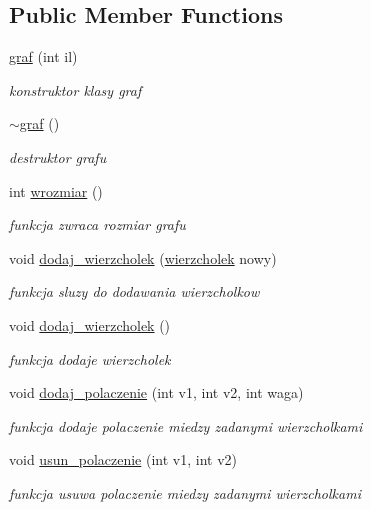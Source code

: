 \subsection*{\-Public \-Member \-Functions}
\begin{DoxyCompactItemize}
\item 
\hyperlink{classgraf_a66fe29b772c7e3085b161a31682ef093}{graf} (int il)
\begin{DoxyCompactList}\small\item\em konstruktor klasy graf \end{DoxyCompactList}\item 
\hyperlink{classgraf_a9aefd40799975c316a17bd67021e05f2}{$\sim$graf} ()
\begin{DoxyCompactList}\small\item\em destruktor grafu \end{DoxyCompactList}\item 
int \hyperlink{classgraf_aa045d28e07e38ca32adf1b353077f877}{wrozmiar} ()
\begin{DoxyCompactList}\small\item\em funkcja zwraca rozmiar grafu \end{DoxyCompactList}\item 
void \hyperlink{classgraf_a6a50b0bfb5fc3cfc7a443014170b9565}{dodaj\-\_\-wierzcholek} (\hyperlink{classwierzcholek}{wierzcholek} nowy)
\begin{DoxyCompactList}\small\item\em funkcja sluzy do dodawania wierzcholkow \end{DoxyCompactList}\item 
void \hyperlink{classgraf_afaa55f5a9aef1f30a2b3be97b59a476b}{dodaj\-\_\-wierzcholek} ()
\begin{DoxyCompactList}\small\item\em funkcja dodaje wierzcholek \end{DoxyCompactList}\item 
void \hyperlink{classgraf_a4db0ebc4302facfc027dd7790542fb94}{dodaj\-\_\-polaczenie} (int v1, int v2, int waga)
\begin{DoxyCompactList}\small\item\em funkcja dodaje polaczenie miedzy zadanymi wierzcholkami \end{DoxyCompactList}\item 
void \hyperlink{classgraf_ac7e01e940f136f4020e4da816c2fb1b4}{usun\-\_\-polaczenie} (int v1, int v2)
\begin{DoxyCompactList}\small\item\em funkcja usuwa polaczenie miedzy zadanymi wierzcholkami \end{DoxyCompactList}\item 

\end{DoxyCompactItemize}
